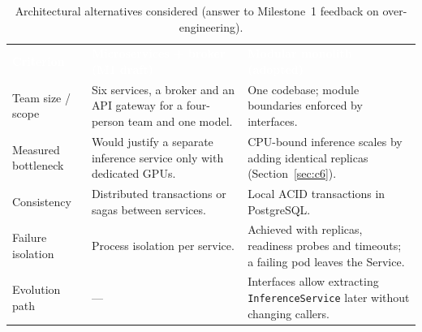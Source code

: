\documentclass[12pt,a4paper]{article}
\newcommand{\hd}[1]{\textcolor{white}{\textbf{#1}}}
\begin{document}
\begin{table}[H]
\centering
\caption{Architectural alternatives considered (answer to Milestone~1 feedback on over-engineering).}
\label{tab:archalt}
\renewcommand{\arraystretch}{1.3}
\begin{tabularx}{\textwidth}{L{2.6cm} Y Y}
\hd{Criterion} & \hd{Microservices + broker (M1 draft)} & \hd{Modular monolith (adopted)} \\
Team size / scope & Six services, a broker and an API gateway for a four-person team and one model. & One codebase; module boundaries enforced by interfaces. \\
Measured bottleneck & Would justify a separate inference service only with dedicated GPUs. & CPU-bound inference scales by adding identical replicas (Section~\ref{sec:c6}). \\
Consistency & Distributed transactions or sagas between services. & Local ACID transactions in PostgreSQL. \\
Failure isolation & Process isolation per service. & Achieved with replicas, readiness probes and timeouts; a failing pod leaves the Service. \\
Evolution path & --- & Interfaces allow extracting \texttt{InferenceService} later without changing callers. \\
\end{tabularx}
\end{table}
\end{document}

